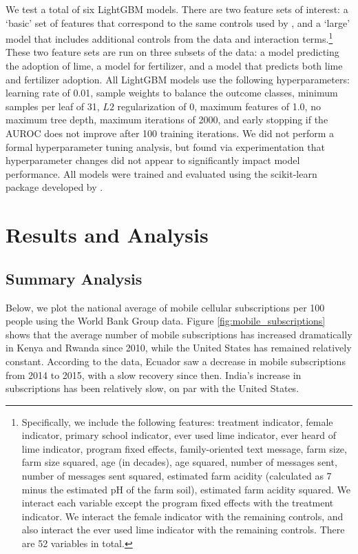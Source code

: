 \documentclass[12pt]{article}
\begin{document}
We test a total of six LightGBM models. There are two feature sets of interest: a `basic' set of features that correspond to the same controls used by \textcite{fabregas_digital_2025}, and a `large' model that includes additional controls from the data and interaction terms.\footnote{Specifically, we include the following features: treatment indicator, female indicator, primary school indicator, ever used lime indicator, ever heard of lime indicator, program fixed effects, family-oriented text message, farm size, farm size squared, age (in decades), age squared, number of messages sent, number of messages sent squared, estimated farm acidity (calculated as 7 minus the estimated pH of the farm soil), estimated farm acidity squared. We interact each variable except the program fixed effects with the treatment indicator. We interact the female indicator with the remaining controls, and also interact the ever used lime indicator with the remaining controls. There are 52 variables in total.} These two feature sets are run on three subsets of the data: a model predicting the adoption of lime, a model for fertilizer, and a model that predicts both lime and fertilizer adoption. All LightGBM models use the following hyperparameters: learning rate of 0.01, sample weights to balance the outcome classes, minimum samples per leaf of 31, $L2$ regularization of 0, maximum features of 1.0, no maximum tree depth, maximum iterations of 2000, and early stopping if the AUROC does not improve after 100 training iterations. We did not perform a formal hyperparameter tuning analysis, but found via experimentation that hyperparameter changes did not appear to significantly impact model performance. All models were trained and evaluated using the \textsf{scikit-learn} package developed by \textcite{pedregosa_scikit-learn_2018}.

\section{Results and Analysis}
\label{section:results}
\subsection{Summary Analysis}
Below, we plot the national average of mobile cellular subscriptions per 100 people using the World Bank Group data. Figure \ref{fig:mobile_subscriptions} shows that the average number of mobile subscriptions has increased dramatically in Kenya and Rwanda since 2010, while the United States has remained relatively constant. According to the data, Ecuador saw a decrease in mobile subscriptions from 2014 to 2015, with a slow recovery since then. India's increase in subscriptions has been relatively slow, on par with the United States. 
\end{document}
